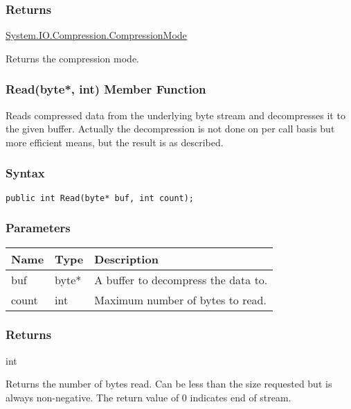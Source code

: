 \documentclass[a4paper,oneside,11.000000pt]{book}
\begin{document}
\subsubsection*{Returns}
\hyperlink{System.IO.Compression.CompressionMode}{System.\-IO.\-Compression.\-CompressionMode}\begin{flushleft}
Returns the compression mode.

\end{flushleft}
\clearpage

\hypertarget{System.IO.Compression.BZip2Stream.Read.P.System.IO.Compression.BZip2Stream.P.byte.int}{\subsubsection*{Read(byte*, int) Member Function}}
\begin{flushleft}
Reads compressed data from the underlying byte stream and decompresses it to the given buffer.
Actually the decompression is not done on per call basis but more efficient means, but
the result is as described.

\end{flushleft}
\subsubsection*{Syntax}\texttt{public int Read(byte* buf, int count);}

\subsubsection*{Parameters}
\begin{flushleft}
\begin{supertabular}[l]{lll}
\textbf{Name}
& \textbf{Type}
& \textbf{Description}
\\
\hline
buf
& byte*
& A buffer to decompress the data to.

\\
count
& int
& Maximum number of bytes to read.

\\
\end{supertabular}

\end{flushleft}
\subsubsection*{Returns}int
\begin{flushleft}
Returns the number of bytes read. Can be less than the size requested but is always non-negative.
The return value of 0 indicates end of stream.

\end{flushleft}
\end{document}

